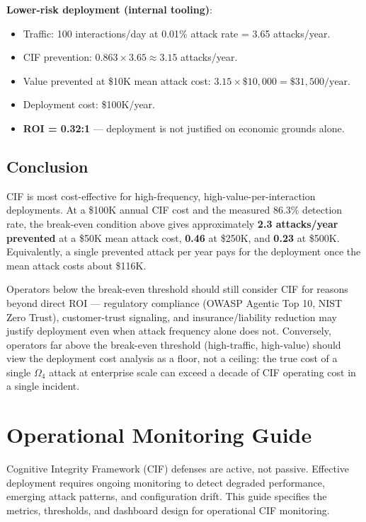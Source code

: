 \documentclass[
]{article}
\providecommand{\tightlist}{%
  \setlength{\itemsep}{0pt}\setlength{\parskip}{0pt}}
\begin{document}
\textbf{Lower-risk deployment (internal tooling)}:

\begin{itemize}
\tightlist
\item
  Traffic: 100 interactions/day at 0.01\% attack rate = 3.65
  attacks/year.
\item
  CIF prevention: \(0.863 \times 3.65 \approx 3.15\) attacks/year.
\item
  Value prevented at \$10K mean attack cost:
  \(3.15 \times \$10{,}000 = \$31{,}500/\text{year}\).
\item
  Deployment cost: \$100K/year.
\item
  \textbf{ROI = 0.32:1} --- deployment is not justified on economic
  grounds alone.
\end{itemize}

\subsection{Conclusion}\label{conclusion}

CIF is most cost-effective for high-frequency,
high-value-per-interaction deployments. At a \$100K annual CIF cost and
the measured 86.3\% detection rate, the break-even condition above gives
approximately \textbf{2.3 attacks/year prevented} at a \$50K mean attack
cost, \textbf{0.46} at \$250K, and \textbf{0.23} at \$500K.
Equivalently, a single prevented attack per year pays for the deployment
once the mean attack costs about \$116K.

Operators below the break-even threshold should still consider CIF for
reasons beyond direct ROI --- regulatory compliance (OWASP Agentic Top
10, NIST Zero Trust), customer-trust signaling, and insurance/liability
reduction may justify deployment even when attack frequency alone does
not. Conversely, operators far above the break-even threshold
(high-traffic, high-value) should view the deployment cost analysis as a
floor, not a ceiling: the true cost of a single \(\Omega_4\) attack at
enterprise scale can exceed a decade of CIF operating cost in a single
incident.

\newpage

\newpage

\section{Operational Monitoring Guide}\label{sec:monitoring-guide}

Cognitive Integrity Framework (CIF) defenses are active, not passive.
Effective deployment requires ongoing monitoring to detect degraded
performance, emerging attack patterns, and configuration drift. This
guide specifies the metrics, thresholds, and dashboard design for
operational CIF monitoring.
\end{document}
